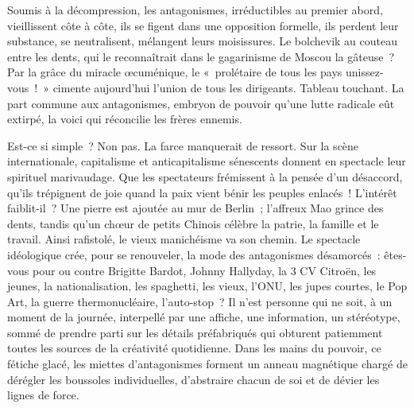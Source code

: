 \documentclass[french,twoside]{book} %
\newcommand{\astermono}{\medskip\centerline{\color{rubric}\large\selectfont{\syms ✻}}\medskip\par}%
\begin{document}
\astermono

\noindent Soumis à la décompression, les antagonismes, irréductibles au premier abord, vieillissent côte à côte, ils se figent dans une opposition formelle, ils perdent leur substance, se neutralisent, mélangent leurs moisissures. Le bolchevik au couteau entre les dents, qui le reconnaîtrait dans le gagarinisme de Moscou la gâteuse ? Par la grâce du miracle œcuménique, le « prolétaire de tous les pays unissez-vous ! » cimente aujourd’hui l’union de tous les dirigeants. Tableau touchant. La part commune aux antagonismes, embryon de pouvoir qu’une lutte radicale eût extirpé, la voici qui réconcilie les frères ennemis.\par
Est-ce si simple ? Non pas. La farce manquerait de ressort. Sur la scène internationale, capitalisme et anticapitalisme sénescents donnent en spectacle leur spirituel marivaudage. Que les spectateurs frémissent à la pensée d’un désaccord, qu’ils trépignent de joie quand la paix vient bénir les peuples enlacés ! L’intérêt faiblit-il ? Une pierre est ajoutée au mur de Berlin ; l’affreux Mao grince des dents, tandis qu’un chœur de petits Chinois célèbre la patrie, la famille et le travail. Ainsi rafistolé, le vieux manichéisme va son chemin. Le spectacle idéologique crée, pour se renouveler, la mode des antagonismes désamorcés : êtes-vous pour ou contre Brigitte Bardot, Johnny Hallyday, la 3 CV Citroën, les jeunes, la nationalisation, les spaghetti, les vieux, l’ONU, les jupes courtes, le Pop Art, la guerre thermonucléaire, l’auto-stop ? Il n’est personne qui ne soit, à un moment de la journée, interpellé par une affiche, une information, un stéréotype, sommé de prendre parti sur les détails préfabriqués qui obturent patiemment toutes les sources de la créativité quotidienne. Dans les mains du pouvoir, ce fétiche glacé, les miettes d’antagonismes forment un anneau magnétique chargé de dérégler les boussoles individuelles, d’abstraire chacun de soi et de dévier les lignes de force.\par
\end{document}

